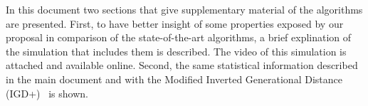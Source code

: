 In this document two sections that give supplementary material of the algorithms are presented.
%
First, to have better insight of some properties exposed by our proposal in comparison of the state-of-the-art algorithms, a brief explination of the simulation that includes them is described.
%
The video of this simulation is attached and available online.
%
Second, the same statistical information described in the main document and with the Modified Inverted Generational Distance (IGD+)~\cite{Joel:Inverted_Generational_Distance_Plus} is shown.
%
%
%
